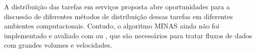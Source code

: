 A distribuição das tarefas em serviços proposta abre oportunidades para a
discussão de diferentes métodos de distribuição dessas tarefas em diferentes
ambientes computacionais.
Contudo, o algoritmo MINAS ainda não foi implementado e avaliado com
 ou , que são
necessários para tratar fluxos de dados com grandes volumes e velocidades.




\newcommand{\stream}{\emph{data stream}\xspace}
\newcommand{\streams}{\emph{data streams}\xspace}
\newcommand{\streamMining}{\emph{data stream mining}\xspace}

